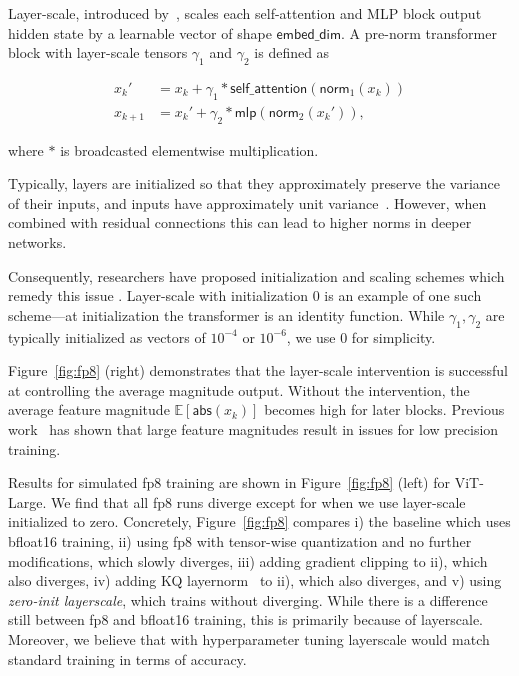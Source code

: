 Layer-scale, introduced by~\citet{touvron2021going}, scales each self-attention and MLP block output hidden state by a learnable vector of shape $\mathsf{embed\_dim}$.
A pre-norm transformer block with layer-scale tensors $\gamma_1$ and $\gamma_2$ is defined as

\begin{align}
    x_{k}' &= x_k + \gamma_1 * \mathsf{self\_attention}(\mathsf{norm}_1(x_k)) \\
    x_{k+1} &= x_k' + \gamma_2 * \mathsf{mlp}(\mathsf{norm}_2(x_{k}')),
\end{align}

where $*$ is broadcasted elementwise multiplication.

Typically, layers are initialized so that they approximately preserve the variance of their inputs, and inputs have approximately unit variance~\cite{glorot2010understanding,he2015delving}. However, when combined with residual connections this can lead to higher norms in deeper networks.

Consequently, researchers have proposed initialization and scaling schemes which remedy this issue
\cite{bachlechner2021rezero, zhang2019fixup, brock2021high, dinan2023effective}. Layer-scale with initialization 0 is an example of one such scheme---at initialization the transformer is an identity function. While $\gamma_1,\gamma_2$ are typically initialized as vectors of $10^{-4}$ or $10^{-6}$, we use 0 for simplicity.

Figure~\ref{fig:fp8} (right) demonstrates that the layer-scale intervention is successful at controlling the average magnitude output. Without the intervention, the average feature magnitude $\mathds{E}[\mathsf{abs}(x_k)]$ becomes high for later blocks. Previous work~\cite{dettmers2022llm} has shown that large feature magnitudes result in issues for low precision training.

Results for simulated fp8 training are shown in Figure~\ref{fig:fp8} (left) for ViT-Large. We find that all fp8 runs diverge except for when we use layer-scale initialized to zero. Concretely, Figure~\ref{fig:fp8} compares i) the baseline which uses bfloat16 training, ii) using fp8 with tensor-wise quantization and no further modifications, which slowly diverges, iii) adding gradient clipping to ii), which also diverges, iv) adding KQ layernorm~\cite{dehghani2023scaling} to ii), which also diverges, and v) using \textit{zero-init layerscale}, which trains without diverging. While there is a difference still between fp8 and bfloat16 training, this is primarily because of layerscale. Moreover, we believe that with hyperparameter tuning layerscale would match standard training in terms of accuracy.

